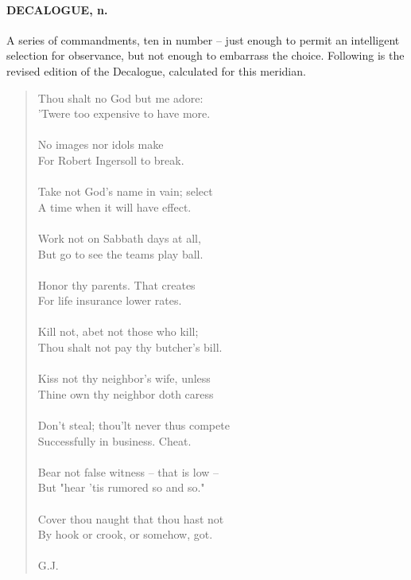 \documentclass[11pt]{article}
\begin{document}
\paragraph{DECALOGUE, n.}  A series of commandments, ten in number -- just enough
to permit an intelligent selection for observance, but not enough to
embarrass the choice.  Following is the revised edition of the
Decalogue, calculated for this meridian.

\begin{quote}   Thou shalt no God but me adore: \\
  'Twere too expensive to have more. \\
 \\
  No images nor idols make \\
  For Robert Ingersoll to break. \\
 \\
  Take not God's name in vain; select \\
  A time when it will have effect. \\
 \\
  Work not on Sabbath days at all, \\
  But go to see the teams play ball. \\
 \\
  Honor thy parents.  That creates \\
  For life insurance lower rates. \\
 \\
  Kill not, abet not those who kill; \\
  Thou shalt not pay thy butcher's bill. \\
 \\
  Kiss not thy neighbor's wife, unless \\
  Thine own thy neighbor doth caress \\
 \\
  Don't steal; thou'lt never thus compete \\
  Successfully in business.  Cheat. \\
 \\
  Bear not false witness -- that is low -- \\
  But "hear 'tis rumored so and so." \\
 \\
  Cover thou naught that thou hast not \\
  By hook or crook, or somehow, got. \\
 \\
G.J. \end{quote}
\end{document}
